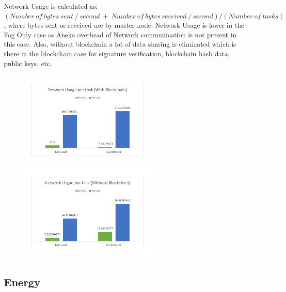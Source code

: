 \documentclass[AMA,STIX1COL]{WileyNJD-v2}
\begin{document}
Network Usage is calculated as: $(Number\ of\ bytes\ sent\ /\ second\ +\ Number\ of\ bytes\ received\ /\ second)/(Number\ of\ tasks)$, where bytes sent or received are by master node. Network Usage is lower in the Fog Only case as Aneka overhead of Network communication is not present in this case. Also, without blockchain a lot of data sharing is eliminated which is there in the blockchain case for signature verification, blockchain hash data, public keys, etc.
\begin{figure}[h]
\centering
\includegraphics[width=7cm]{g61} \ \ \ \ \ \ \ \ \ \ \       
\includegraphics[width=7cm]{g62}
\end{figure}

\newpage

\subsection{Energy}
\end{document}
